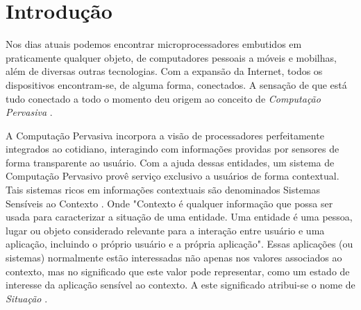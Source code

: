 \documentclass[
	12pt,				%
	openright,			%
	twoside,			%
	a4paper,			%
	english,			%
	french,				%
	spanish,			%
	brazil,				%
	]{abntex2}
\begin{document}
\frenchspacing 


\imprimircapa

\imprimirfolhaderosto

\chapter*[Introdução]{Introdução}

Nos dias atuais podemos encontrar microprocessadores embutidos em praticamente qualquer objeto, de computadores pessoais a móveis e mobilhas, além de diversas outras tecnologias. Com a expansão da Internet, todos os dispositivos encontram-se, de alguma forma, conectados. A sensação de que está tudo conectado a todo o momento deu origem ao conceito de \textit{Computação Pervasiva} \cite{juan-2010}.

A Computação Pervasiva incorpora a visão de processadores perfeitamente integrados ao cotidiano, interagindo com informações providas por sensores de forma transparente ao usuário. Com a ajuda dessas entidades, um sistema de Computação Pervasivo provê serviço exclusivo a usuários de forma contextual. Tais sistemas ricos em informações contextuais são denominados Sistemas Sensíveis ao Contexto \cite{dockhorn-2007}. Onde "Contexto é qualquer informação que possa ser usada para caracterizar a situação de uma entidade. Uma entidade é uma pessoa, lugar ou objeto considerado relevante para a interação entre usuário e uma aplicação, incluindo o próprio usuário e a própria aplicação"\cite{abowd-1999}. Essas aplicações (ou sistemas) normalmente estão interessadas não apenas nos valores associados ao contexto, mas no significado que este valor pode representar, como um estado de interesse da aplicação sensível ao contexto. A este significado atribui-se o nome de \textit{Situação} \cite{dockhorn-2007}.
% 
% 
% 
% 
\end{document}
